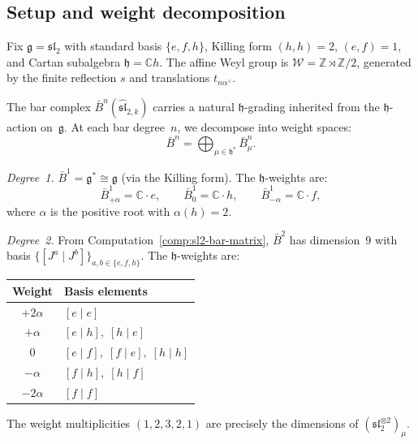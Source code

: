 \subsection{Setup and weight decomposition}

Fix $\mathfrak{g} = \mathfrak{sl}_2$ with standard basis
$\{e, f, h\}$, Killing form $(h,h) = 2$, $(e,f) = 1$, and Cartan
subalgebra $\mathfrak{h} = \mathbb{C} h$.  The affine Weyl group is
$\mathcal{W} = \mathbb{Z} \rtimes \mathbb{Z}/2$, generated by the
finite reflection $s$ and translations $t_{n\alpha^\vee}$.

The bar complex $\bar{B}^n(\widehat{\mathfrak{sl}}_{2,k})$ carries a
natural $\mathfrak{h}$-grading inherited from the $\mathfrak{h}$-action
on~$\mathfrak{g}$.  At each bar degree~$n$, we decompose into weight
spaces:
\begin{equation}\label{eq:bar-weight-decomposition}
\bar{B}^n = \bigoplus_{\mu \in \mathfrak{h}^*} \bar{B}^n_\mu.
\end{equation}

\begin{computation}
\label{comp:bgg-weight-decomp}

\emph{Degree~1.}  $\bar{B}^1 = \mathfrak{g}^* \cong \mathfrak{g}$
(via the Killing form).  The $\mathfrak{h}$-weights are:
\begin{equation}\label{eq:degree1-weights}
\bar{B}^1_{+\alpha} = \mathbb{C} \cdot e, \qquad
\bar{B}^1_0 = \mathbb{C} \cdot h, \qquad
\bar{B}^1_{-\alpha} = \mathbb{C} \cdot f,
\end{equation}
where $\alpha$ is the positive root with $\alpha(h) = 2$.

\emph{Degree~2.}  From Computation~\ref{comp:sl2-bar-matrix},
$\bar{B}^2$ has dimension~$9$ with basis
$\{[J^a \mid J^b]\}_{a,b \in \{e,f,h\}}$.  The
$\mathfrak{h}$-weights are:
\begin{center}
\renewcommand{\arraystretch}{1.2}
\begin{tabular}{cl}
\textbf{Weight} & \textbf{Basis elements} \\
\hline
$+2\alpha$ & $[e \mid e]$ \\
$+\alpha$ & $[e \mid h],\; [h \mid e]$ \\
$0$ & $[e \mid f],\; [f \mid e],\; [h \mid h]$ \\
$-\alpha$ & $[f \mid h],\; [h \mid f]$ \\
$-2\alpha$ & $[f \mid f]$ \\
\end{tabular}
\end{center}
The weight multiplicities $(1, 2, 3, 2, 1)$ are precisely the dimensions
of $(\mathfrak{sl}_2^{\otimes 2})_\mu$.
\end{computation}


